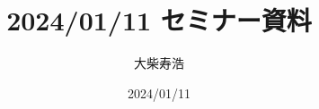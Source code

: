 \theoremstyle{mystyle}
\newtheorem{AXM}{公理}[section]
\newtheorem{DFN}[AXM]{定義}
\newtheorem{THM}[AXM]{定理}
\newtheorem*{THM*}{定理}
\newtheorem{PRP}[AXM]{命題}
\newtheorem{LMM}[AXM]{補題}
\newtheorem{CRL}[AXM]{系}
\newtheorem{EG}[AXM]{例}
\newtheorem*{EG*}{例}
\newtheorem{CNV}[AXM]{規約}
\newtheorem{CMT}[AXM]{コメント}


\usepackage{framed}
\renewenvironment{leftbar}{%
  \def\FrameCommand{\textcolor{lightgray}{\vrule width 0.7zw} \hspace{10pt}}%
  \MakeFramed {\advance\hsize-\width \FrameRestore}}%
{\endMakeFramed}
\newenvironment{redleftbar}{%
  \def\FrameCommand{\textcolor{lightgray}{\vrule width 1pt} \hspace{10pt}}%
  \MakeFramed {\advance\hsize-\width \FrameRestore}}%
 {\endMakeFramed}








\def\inner<#1>{\langle #1 \rangle}








\title{2024/01/11 セミナー資料}
\author{大柴寿浩}
\date{2024/01/11}

\maketitle
